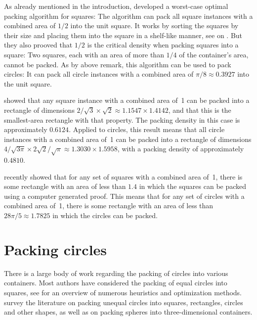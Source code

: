 \documentclass[a4paper,style=print,oneside,bibliography=totoc,nexus,lnum,extramargin]{tubsbook}
\begin{document}
As already mentioned in the introduction, \textcite{MM1967some} developed a worst-case optimal packing algorithm for squares: The algorithm can pack all square instances with a combined area of $1/2$ into the unit square.
It works by sorting the squares by their size and placing them into the square in a shelf-like manner, see  on .
But they also prooved that $1/2$ is the critical density when packing squares into a square: Two squares, each with an area of more than $1/4$ of the container's area, cannot be packed.
As by above remark, this algorithm can be used to pack circles: It can pack all circle instances with a combined area of $\pi/8 \approx 0.3927$ into the unit square.

\textcite{KK1975optimal} showed that any square instance with a combined area of~1 can be packed into a rectangle of dimensions $2/\sqrt{3} \times \sqrt{2} \approx 1.1547 \times 1.4142$, and that this is the smallest-area rectangle with that property. The packing density in this case is approximately $0.6124$. Applied to circles, this result means that all circle instances with a combined area of~1 can be packed into a rectangle of dimensions $4/\sqrt{3\pi} \times 2\sqrt{2}/\sqrt{\pi} \approx 1.3030 \times 1.5958$, with a packing density of approximately $0.4810$.

\textcite{hougardy2011packing} recently showed that for any set of squares with a combined area of~1, there is some rectangle with an area of less than $1.4$ in which the squares can be packed using a computer generated proof. This means that for any set of circles with a combined area of~1, there is some rectangle with an area of less than $28\pi/5 \approx 1.7825$ in which the circles can be packed.

\section{Packing circles}

There is a large body of work regarding the packing of circles into various containers. Most authors have considered the packing of equal circles into squares, see \textcite{SMCSCG2007new} for an overview of numerous heuristics and optimization methods. \textcite{HM2009literature} survey the literature on packing unequal circles into squares, rectangles, circles and other shapes, as well as on packing spheres into three-dimensional containers.

\end{document}
